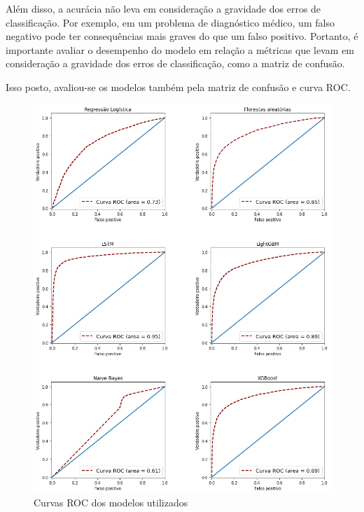 Além disso, a acurácia não leva em consideração a gravidade dos erros de classificação. Por exemplo, em um problema de diagnóstico médico, um falso negativo pode ter consequências mais graves do que um falso positivo. Portanto, é importante avaliar o desempenho do modelo em relação a métricas que levam em consideração a gravidade dos erros de classificação, como a matriz de confusão.

Isso posto, avaliou-se os modelos também pela matriz de confusão e curva ROC.


\begin{figure}[H]
    \centering
    \includegraphics[scale=0.6]{./figs/roc_v.png}
    \caption{Curvas ROC dos modelos utilizados}
    \label{fig:roccurve}
\end{figure}

